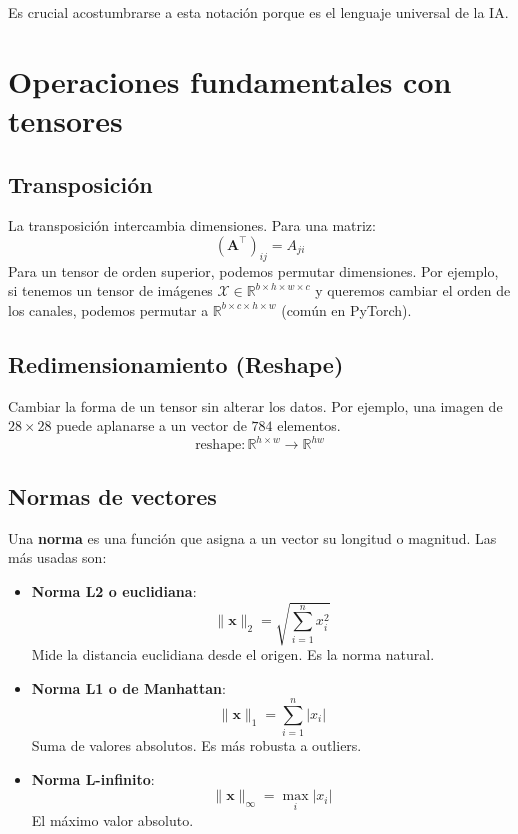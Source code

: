 \documentclass[12pt,a4paper,openany,oneside]{book}
\begin{document}
Es crucial acostumbrarse a esta notación porque es el lenguaje universal de la IA.

\section{Operaciones fundamentales con tensores}

\subsection{Transposición}
La transposición intercambia dimensiones. Para una matriz:
\begin{equation*}
(\mathbf{A}^\top)_{ij} = A_{ji}
\end{equation*}
Para un tensor de orden superior, podemos permutar dimensiones. Por ejemplo, si tenemos un tensor de imágenes $\mathcal{X} \in \mathbb{R}^{b \times h \times w \times c}$ y queremos cambiar el orden de los canales, podemos permutar a $\mathbb{R}^{b \times c \times h \times w}$ (común en PyTorch).

\subsection{Redimensionamiento (Reshape)}
Cambiar la forma de un tensor sin alterar los datos. Por ejemplo, una imagen de $28\times28$ puede aplanarse a un vector de $784$ elementos.
\begin{equation*}
\text{reshape}: \mathbb{R}^{h \times w} \rightarrow \mathbb{R}^{hw}
\end{equation*}

\subsection{Normas de vectores}
Una \textbf{norma} es una función que asigna a un vector su longitud o magnitud. Las más usadas son:

\begin{itemize}
    \item \textbf{Norma L2 o euclidiana}:
    \begin{equation*}
    \|\mathbf{x}\|_2 = \sqrt{\sum_{i=1}^{n} x_i^2}
    \end{equation*}
    Mide la distancia euclidiana desde el origen. Es la norma natural.

    \item \textbf{Norma L1 o de Manhattan}:
    \begin{equation*}
    \|\mathbf{x}\|_1 = \sum_{i=1}^{n} |x_i|
    \end{equation*}
    Suma de valores absolutos. Es más robusta a outliers.

    \item \textbf{Norma L-infinito}:
    \begin{equation*}
    \|\mathbf{x}\|_\infty = \max_i |x_i|
    \end{equation*}
    El máximo valor absoluto.
\end{itemize}
\end{document}
